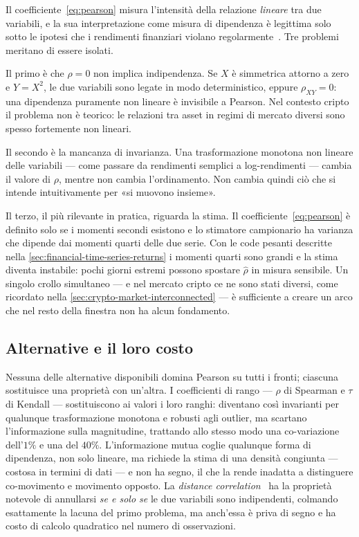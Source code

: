 Il coefficiente~\eqref{eq:pearson} misura l'intensità della relazione \emph{lineare} tra due variabili, e la sua interpretazione come misura di dipendenza è legittima solo sotto le ipotesi che i rendimenti finanziari violano regolarmente~\cite{embrechts2002correlation}. Tre problemi meritano di essere isolati.

Il primo è che $\rho=0$ non implica indipendenza. Se $X$ è simmetrica attorno a zero e $Y=X^2$, le due variabili sono legate in modo deterministico, eppure $\rho_{XY}=0$: una dipendenza puramente non lineare è invisibile a Pearson. Nel contesto cripto il problema non è teorico: le relazioni tra asset in regimi di mercato diversi sono spesso fortemente non lineari.

Il secondo è la mancanza di invarianza. Una trasformazione monotona non lineare delle variabili — come passare da rendimenti semplici a log-rendimenti — cambia il valore di $\rho$, mentre non cambia l'ordinamento. Non cambia quindi ciò che si intende intuitivamente per «si muovono insieme».

Il terzo, il più rilevante in pratica, riguarda la stima. Il coefficiente~\eqref{eq:pearson} è definito solo se i momenti secondi esistono e lo stimatore campionario ha varianza che dipende dai momenti quarti delle due serie. Con le code pesanti descritte nella \cref{sec:financial-time-series-returns} i momenti quarti sono grandi e la stima diventa instabile: pochi giorni estremi possono spostare $\hat\rho$ in misura sensibile. Un singolo crollo simultaneo — e nel mercato cripto ce ne sono stati diversi, come ricordato nella \cref{sec:crypto-market-interconnected} — è sufficiente a creare un arco che nel resto della finestra non ha alcun fondamento.

\subsection{Alternative e il loro costo}

Nessuna delle alternative disponibili domina Pearson su tutti i fronti; ciascuna sostituisce una proprietà con un'altra. I coefficienti di rango — $\rho$ di Spearman e $\tau$ di Kendall — sostituiscono ai valori i loro ranghi: diventano così invarianti per qualunque trasformazione monotona e robusti agli outlier, ma scartano l'informazione sulla magnitudine, trattando allo stesso modo una co-variazione dell'$1\%$ e una del $40\%$. L'informazione mutua coglie qualunque forma di dipendenza, non solo lineare, ma richiede la stima di una densità congiunta — costosa in termini di dati — e non ha segno, il che la rende inadatta a distinguere co-movimento e movimento opposto. La \emph{distance correlation}~\cite{szekely2007distance} ha la proprietà notevole di annullarsi \emph{se e solo se} le due variabili sono indipendenti, colmando esattamente la lacuna del primo problema, ma anch'essa è priva di segno e ha costo di calcolo quadratico nel numero di osservazioni.

